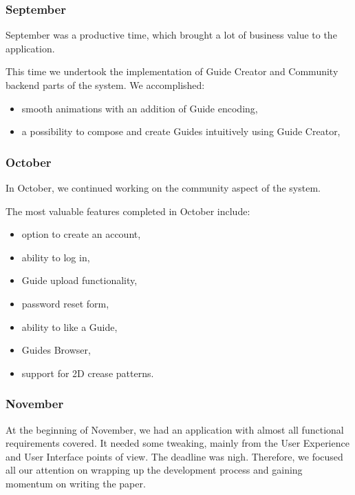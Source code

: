 \subsubsection{September}

September was a productive time, which brought a lot of business value to the application. 

This time we undertook the implementation of Guide Creator and Community backend parts of the system.
\medskip
We accomplished:

\begin{itemize}
	\item smooth animations with an addition of Guide encoding,
	\item a possibility to compose and create Guides intuitively using Guide Creator,
\end{itemize}

\subsubsection{October}

In October, we continued working on the community aspect of the system. 

The most valuable features completed in October include:

\begin{itemize}
	\item option to create an account,
	\item ability to log in,
	\item Guide upload functionality,
	\item password reset form,
	\item ability to like a Guide,
	\item Guides Browser,
	\item support for 2D crease patterns.
\end{itemize}


\subsubsection{November}

At the beginning of November, we had an application with almost all functional requirements covered. It needed some tweaking, mainly from the User Experience and User Interface points of view. The deadline was nigh. Therefore, we focused all our attention on wrapping up the development process and gaining momentum on writing the paper.

